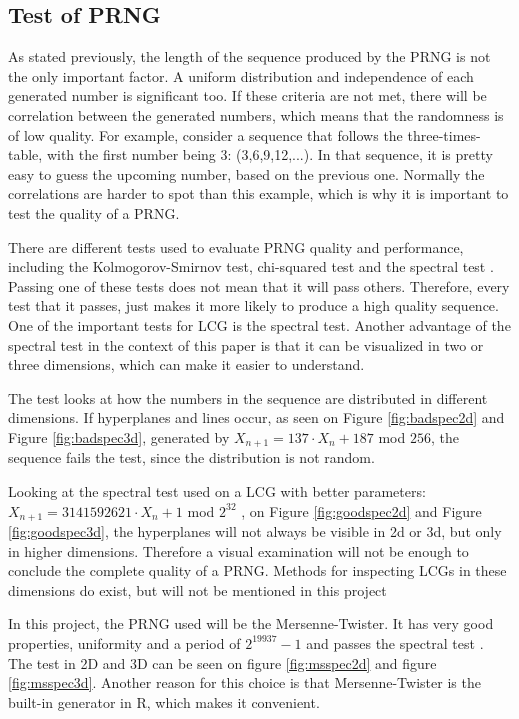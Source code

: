 \subsection{Test of PRNG}
As stated previously, the length of the sequence produced by the PRNG is not the only important factor. A uniform distribution and independence of each generated number is significant too. If these criteria are not met, there will be correlation between the generated numbers, which means that the randomness is of low quality. For example, consider a sequence that follows the three-times-table, with the first number being 3: (3,6,9,12,...). In that sequence, it is pretty easy to guess the upcoming number, based on the previous one. Normally the correlations are harder to spot than this example, which is why it is important to test the quality of a PRNG.
\newline

\noindent There are different tests used to evaluate PRNG quality and performance, including the Kolmogorov-Smirnov test, chi-squared test and the spectral test \cite{knuth}. Passing one of these tests does not mean that it will pass others. Therefore, every test that it passes, just makes it more likely to produce a high quality sequence. One of the important tests for LCG is the spectral test. Another advantage of the spectral test in the context of this paper is that it can be visualized in two or three dimensions, which can make it easier to understand.
\newline

\noindent The test looks at how the numbers in the sequence are distributed in different dimensions. If hyperplanes and lines occur, as seen on Figure \ref{fig:badspec2d} and Figure \ref{fig:badspec3d}, generated by $X_{n+1}=137\cdot X_{n}+187$ mod $256$, the sequence fails the test, since the distribution is not random.
\newline

\noindent Looking at the spectral test used on a LCG with better parameters:  $X_{n+1}=3 141 592 621\cdot X_{n}+1$ mod $2^{32}$ \cite{knuth}, on Figure \ref{fig:goodspec2d} and Figure \ref{fig:goodspec3d}, the hyperplanes will not always be visible in 2d or 3d, but only in higher dimensions. Therefore a visual examination will not be enough to conclude the complete quality of a PRNG. Methods for inspecting LCGs in these dimensions do exist, but will not be mentioned in this project
\newline

\noindent In this project, the PRNG used will be the Mersenne-Twister. It has very good properties, uniformity and a period of $2^19937-1$ and passes the spectral test \cite{mersenne}. The test in 2D and 3D can be seen on figure \ref{fig:msspec2d} and figure \ref{fig:msspec3d}. Another reason for this choice is that Mersenne-Twister is the built-in generator in R, which makes it convenient. 


